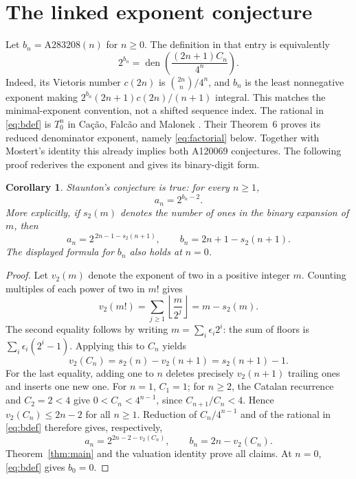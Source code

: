 \documentclass[11pt]{article}
\newtheorem{corollary}[theorem]{Corollary}
\newcommand{\den}{\operatorname{den}}
\begin{document}
\section{The linked exponent conjecture}
Let $b_n=\mathrm{A283208}(n)$ for $n\geq0$. The definition in that
entry \cite{vietoris} is equivalently
\begin{equation}\label{eq:bdef}
 2^{b_n}=\den\left(\frac{(2n+1)C_n}{4^n}\right).
\end{equation}
Indeed, its Vietoris number $c(2n)$ is $\binom{2n}{n}/4^n$,
and $b_n$ is the least nonnegative exponent making
$2^{b_n}(2n+1)c(2n)/(n+1)$ integral. This matches the
minimal-exponent convention, not a shifted sequence index.
The rational in \eqref{eq:bdef} is $T_0^n$ in
Ca\c{c}\~ao, Falc\~ao and Malonek \cite[Eq.~(5.6)]{cacao2017}.
Their Theorem~6 proves its reduced denominator exponent, namely
\eqref{eq:factorial} below. Together with Mostert's identity this
already implies both A120069 conjectures. The following proof
rederives the exponent and gives its binary-digit form.

\begin{corollary}\label{cor:staunton}
Staunton's conjecture is true: for every $n\geq1$,
\[
 a_n=2^{b_n-2}.
\]
More explicitly, if $s_2(m)$ denotes the number of ones in the binary
expansion of $m$, then
\begin{equation}\label{eq:digits}
 a_n=2^{\,2n-1-s_2(n+1)},\qquad
 b_n=2n+1-s_2(n+1).
\end{equation}
The displayed formula for $b_n$ also holds at $n=0$.
\end{corollary}
\begin{proof}
Let $v_2(m)$ denote the exponent of two in a positive integer $m$.
Counting multiples of each power of two in $m!$ gives
\[
 v_2(m!)=\sum_{j\geq1}\left\lfloor\frac{m}{2^j}\right\rfloor
        =m-s_2(m).
\]
The second equality follows by writing $m=\sum_i\epsilon_i2^i$:
the sum of floors is $\sum_i\epsilon_i(2^i-1)$.
Applying this to $C_n$ yields
\[
 v_2(C_n)=s_2(n)-v_2(n+1)=s_2(n+1)-1.
\]
For the last equality, adding one to $n$ deletes precisely
$v_2(n+1)$ trailing ones and inserts one new one.
For $n=1$, $C_1=1$; for $n\geq2$, the Catalan recurrence and
$C_2=2<4$ give $0<C_n<4^{n-1}$, since $C_{n+1}/C_n<4$.
Hence $v_2(C_n)\leq2n-2$ for all $n\geq1$.
Reduction of $C_n/4^{n-1}$ and of the rational in
\eqref{eq:bdef} therefore gives, respectively,
\[
 a_n=2^{2n-2-v_2(C_n)},\qquad b_n=2n-v_2(C_n).
\]
Theorem~\ref{thm:main} and the valuation identity prove all claims.
At $n=0$, \eqref{eq:bdef} gives $b_0=0$.
\end{proof}
\end{document}

